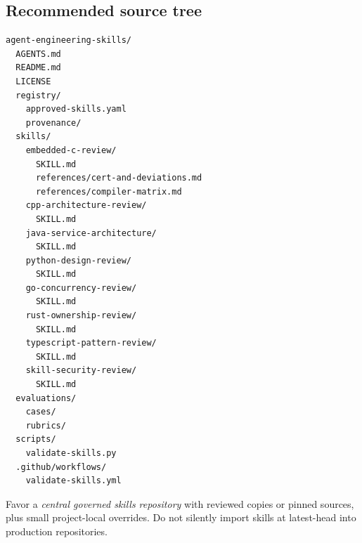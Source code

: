 \documentclass[11pt,letterpaper]{article}
\begin{document}
\subsection{Recommended source tree}
\begin{lstlisting}[style=textstyle]
agent-engineering-skills/
  AGENTS.md
  README.md
  LICENSE
  registry/
    approved-skills.yaml
    provenance/
  skills/
    embedded-c-review/
      SKILL.md
      references/cert-and-deviations.md
      references/compiler-matrix.md
    cpp-architecture-review/
      SKILL.md
    java-service-architecture/
      SKILL.md
    python-design-review/
      SKILL.md
    go-concurrency-review/
      SKILL.md
    rust-ownership-review/
      SKILL.md
    typescript-pattern-review/
      SKILL.md
    skill-security-review/
      SKILL.md
  evaluations/
    cases/
    rubrics/
  scripts/
    validate-skills.py
  .github/workflows/
    validate-skills.yml
\end{lstlisting}
Favor a \emph{central governed skills repository} with reviewed copies or pinned sources, plus small project-local overrides. Do not silently import skills at latest-head into production repositories.
\end{document}
